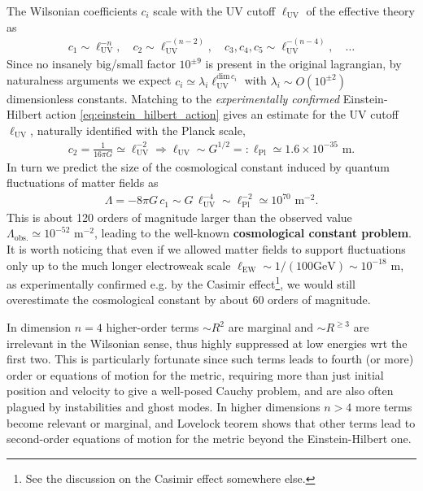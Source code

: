 \documentclass[../geometry_main.tex]{subfiles}
\begin{document}
\begin{mytheorem}
The Wilsonian coefficients $c_i$ scale with the UV cutoff $\ell_{\mathrm{UV}}$ of the effective theory as
\begin{align}
    c_1  \sim \ell_{\mathrm{UV}}^{-n}, \quad c_2 \sim \ell_{\mathrm{UV}}^{-(n-2)}, \quad c_3, c_4, c_5 \sim \ell_{\mathrm{UV}}^{-(n-4)}, \quad \ldots
\end{align}
Since no insanely big/small factor $10^{\pm9}$ is present in the original lagrangian, by naturalness arguments we expect $c_i\simeq \lambda_i \ell_{\mathrm{UV}}^{\mathrm{dim}\, c_i}$ with $\lambda_i\sim O(10^{\pm2})$ dimensionless constants.
%
Matching to the \emph{experimentally confirmed} Einstein-Hilbert action \eqref{eq:einstein_hilbert_action} gives an estimate for the UV cutoff $\ell_{\mathrm{UV}}$, naturally identified with the Planck scale,
\begin{align}
    c_2 = \frac{1}{16\pi G} \simeq \ell_{\mathrm{UV}}^{-2} \Rightarrow \ell_{\mathrm{UV}} \sim G^{1/2} =:  \ell_{\mathrm{Pl}} \simeq 1.6 \times 10^{-35} \text{ m}.
\end{align}
In turn we predict the size of the cosmological constant induced by quantum fluctuations of matter fields as
\begin{align}
    \Lambda = -8\pi G \, c_1 \sim G \, \ell_{\mathrm{UV}}^{-4} \sim \ell_{\mathrm{Pl}}^{-2} \simeq 10^{70} \text{ m}^{-2}.
\end{align}
This is about 120 orders of magnitude larger than the observed value $\Lambda_{\mathrm{obs.}}\simeq 10^{-52} \text{ m}^{-2}$, leading to the well-known \textbf{cosmological constant problem}.
%
It is worth noticing that even if we allowed matter fields to support fluctuations only up to the much longer electroweak scale $\ell_{\mathrm{EW}}\sim 1/(100\mathrm{GeV}) \sim 10^{-18} \text{ m}$, as experimentally confirmed e.g. by the Casimir effect\footnote{See the discussion on the Casimir effect somewhere else.}, we would still overestimate the cosmological constant by about 60 orders of magnitude.

In dimension $n=4$ higher-order terms $\sim R^2$ are marginal and $\sim R^{\geq3}$ are irrelevant in the Wilsonian sense, thus highly suppressed at low energies wrt the first two.
This is particularly fortunate since such terms leads to fourth (or more) order or equations of motion for the metric, requiring more than just initial position and velocity to give a well-posed Cauchy problem, and are also often plagued by instabilities and ghost modes.
In higher dimensions $n>4$ more terms become relevant or marginal, and Lovelock teorem shows that other terms lead to second-order equations of motion for the metric beyond the Einstein-Hilbert one.


\end{mytheorem}
\end{document}
